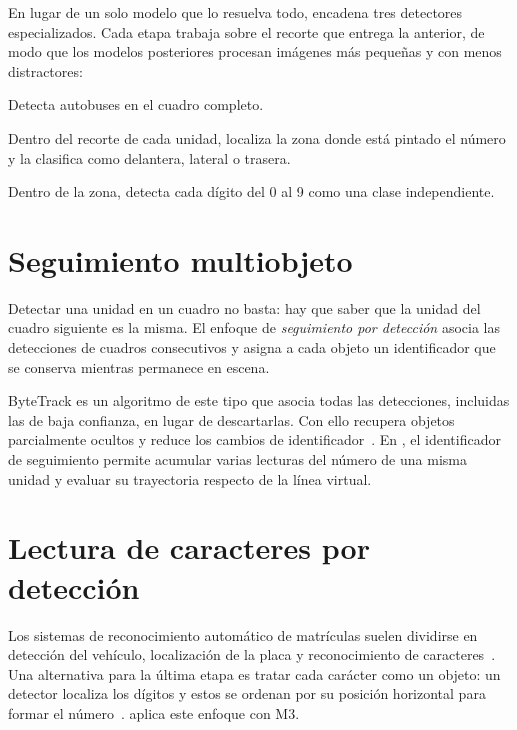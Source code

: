 En lugar de un solo modelo que lo resuelva todo, \saru{} encadena tres
detectores especializados. Cada etapa trabaja sobre el recorte que entrega
la anterior, de modo que los modelos posteriores procesan imágenes más
pequeñas y con menos distractores:

\begin{description}[style=nextline]
  \item[M1 — unidad] Detecta autobuses en el cuadro completo.
  \item[M2 — zona del número] Dentro del recorte de cada unidad, localiza
        la zona donde está pintado el número y la clasifica como
        delantera, lateral o trasera.
  \item[M3 — dígitos] Dentro de la zona, detecta cada dígito del 0 al 9
        como una clase independiente.
\end{description}

\section{Seguimiento multiobjeto}

Detectar una unidad en un cuadro no basta: hay que saber que la unidad del
cuadro siguiente es la misma. El enfoque de \emph{seguimiento por
detección} asocia las detecciones de cuadros consecutivos y asigna a cada
objeto un identificador que se conserva mientras permanece en escena.

ByteTrack es un algoritmo de este tipo que asocia todas las detecciones,
incluidas las de baja confianza, en lugar de descartarlas. Con ello
recupera objetos parcialmente ocultos y reduce los cambios de
identificador~\cite{zhang2022bytetrack}. En \saru{}, el identificador de
seguimiento permite acumular varias lecturas del número de una misma
unidad y evaluar su trayectoria respecto de la línea virtual.

\section{Lectura de caracteres por detección}

Los sistemas de reconocimiento automático de matrículas suelen dividirse
en detección del vehículo, localización de la placa y reconocimiento de
caracteres~\cite{shashirangana2021alpr}. Una alternativa para la última
etapa es tratar cada carácter como un objeto: un detector localiza los
dígitos y estos se ordenan por su posición horizontal para formar el
número~\cite{laroca2018yolo}. \saru{} aplica este enfoque con M3.

